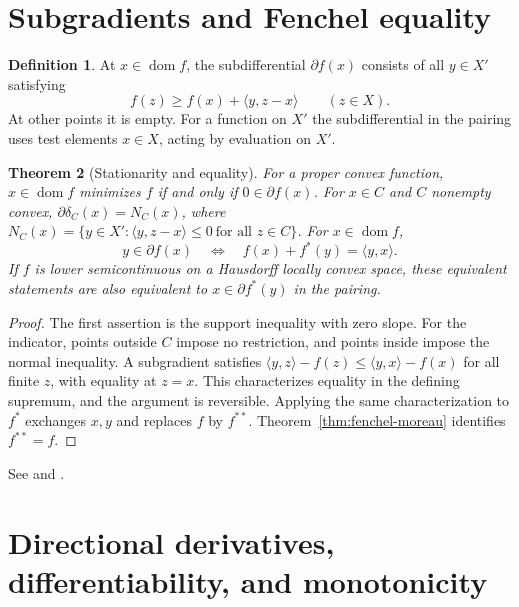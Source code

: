\documentclass[11pt,oneside,openany]{book}
\theoremstyle{plain}
\newtheorem{theorem}{Theorem}[chapter]
\theoremstyle{definition}
\newtheorem{definition}[theorem]{Definition}
\theoremstyle{remark}
\begin{document}
\section{Subgradients and Fenchel equality}\label{v02-06}

\begin{definition}
At \(x\in\operatorname{dom}f\), the subdifferential
\(\partial f(x)\) consists of all \(y\in X'\) satisfying
\[
 f(z)\ge f(x)+\langle y,z-x\rangle\qquad(z\in X).
\]
At other points it is empty. For a function on \(X'\) the
subdifferential in the pairing uses test elements \(x\in X\),
acting by evaluation on \(X'\).
\end{definition}

\begin{theorem}[Stationarity and equality]\label{thm:fenchel-equality}
For a proper convex function, \(x\in\operatorname{dom}f\)
minimizes \(f\) if and only if \(0\in\partial f(x)\).
For \(x\in C\) and \(C\) nonempty convex,
\(\partial\delta_C(x)=N_C(x)\), where
\(N_C(x)=\{y\in X':\langle y,z-x\rangle\le0\ \text{for all }z\in C\}\).
For \(x\in\operatorname{dom}f\),
\[
 y\in\partial f(x)\quad\Longleftrightarrow\quad
 f(x)+f^*(y)=\langle y,x\rangle.
\]
If \(f\) is lower semicontinuous on a Hausdorff locally convex
space, these equivalent statements are also equivalent to
\(x\in\partial f^*(y)\) in the pairing.
\end{theorem}

\begin{proof}
The first assertion is the support inequality with zero
slope. For the indicator, points outside \(C\) impose no
restriction, and points inside impose the normal inequality.
A subgradient satisfies
\(\langle y,z\rangle-f(z)\le\langle y,x\rangle-f(x)\)
for all finite \(z\), with equality at \(z=x\). This
characterizes equality in the defining supremum, and the
argument is reversible. Applying the same characterization
to \(f^*\) exchanges \(x,y\) and replaces \(f\) by \(f^{**}\).
Theorem~\ref{thm:fenchel-moreau} identifies \(f^{**}=f\).
\end{proof}

See \cite[Theorem 23.5]{Rockafellar} and
\cite[Chapter I, \S5]{EkelandTemam}.

\section{Directional derivatives, differentiability, and monotonicity}
\label{v02-07}
\end{document}
